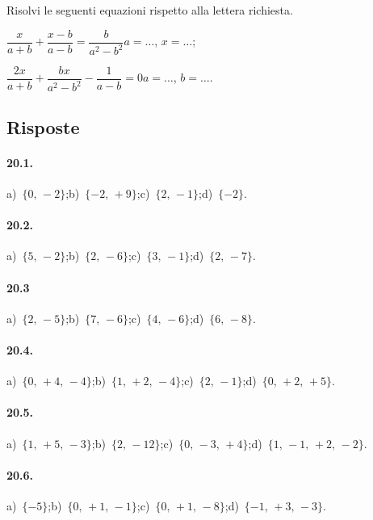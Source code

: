 \begin{esercizio}[\Ast]
\label{ese:20.70}
Risolvi le seguenti equazioni rispetto alla lettera richiesta.
\TabPositions{5cm}
\begin{enumeratea}
 \item $\dfrac{x}{a+b}+\dfrac{x-b}{a-b}=\dfrac{b}{a^{2}-b^{2}}$\tab$a=\ldots$, $x=\ldots$;
 \item $\dfrac{2x}{a+b}+\dfrac{bx}{a^{2}-b^{2}}-\dfrac{1}{a-b}=0$\tab$a=\ldots$, $b=\ldots$.
\end{enumeratea}
\end{esercizio}

\subsection{Risposte}
\begin{multicols}{2}
 \paragraph{20.1.}
a)~$\{0\text{,~}-2\}$;\quad b)~$\{-2\text{,~}+9\}$;\quad c)~$\{2\text{,~}-1\}$;\quad d)~$\{-2\}$.
\paragraph{20.2.}
a)~$\{5\text{,~}-2\}$;\quad b)~$\{2\text{,~}-6\}$;\quad c)~$\{3\text{,~}-1\}$;\quad d)~$\{2\text{,~}-7\}$.
\paragraph{20.3}
a)~$\{2\text{,~}-5\}$;\quad b)~$\{7\text{,~}-6\}$;\quad c)~$\{4\text{,~}-6\}$;\quad d)~$\{6\text{,~}-8\}$.
\paragraph{20.4.}
a)~$\{0\text{,~}+4\text{,~}-4\}$;\quad b)~$\{1\text{,~}+2\text{,~}-4\}$;\quad c)~$\{2\text{,~}-1\}$;\quad d)~$\{0\text{,~}+2\text{,~}+5\}$.
\paragraph{20.5.}
a)~$\{1\text{,~}+5\text{,~}-3\}$;\quad b)~$\{2\text{,~}-12\}$;\quad c)~$\{0\text{,~}-3\text{,~}+4\}$;\quad d)~$\{1\text{,~}-1\text{,~}+2\text{,~}-2\}$.
\paragraph{20.6.}
a)~$\{-5\}$;\quad b)~$\{0\text{,~}+1\text{,~}-1\}$;\quad c)~$\{0\text{,~}+1\text{,~}-8\}$;\quad d)~$\{-1\text{,~}+3\text{,~}-3\}$.

\end{multicols}
